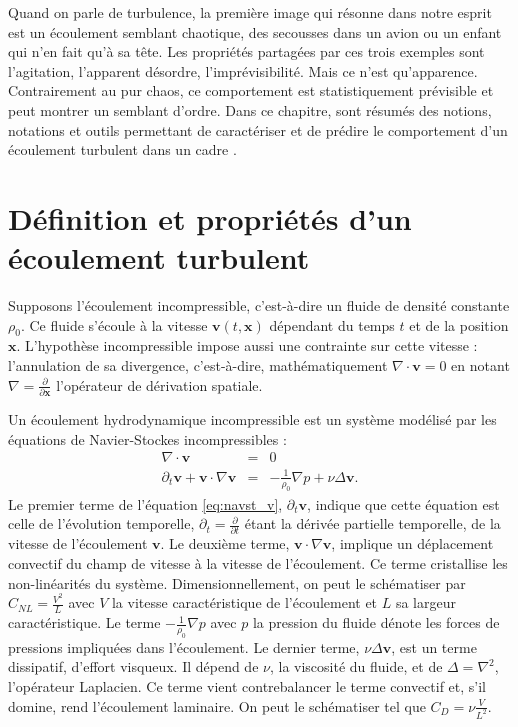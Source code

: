 Quand on parle de turbulence, la première image qui résonne dans notre esprit est un écoulement semblant chaotique, des secousses dans un avion ou un enfant qui n'en fait qu'à sa tête. Les propriétés partagées par ces trois exemples sont l'agitation, l'apparent désordre, l'imprévisibilité. Mais ce n'est qu'apparence. Contrairement au pur chaos, ce comportement est statistiquement prévisible et peut montrer un semblant d'ordre. Dans ce chapitre, sont résumés des notions, notations et outils permettant de caractériser et de prédire le comportement d'un écoulement turbulent dans un cadre . 

\section{Définition et propriétés d'un écoulement turbulent}\label{sec-011}

 Supposons l'écoulement incompressible, c'est-à-dire un fluide de densité constante $\rho_0$. Ce fluide s'écoule à la vitesse $\boldsymbol{v}(t,\mathbf{x})$ dépendant du temps $t$ et de la position $\mathbf{x}$. L'hypothèse incompressible impose aussi une contrainte sur cette vitesse : l'annulation de sa divergence, c'est-à-dire, mathématiquement $\nabla \cdot \boldsymbol{v} = 0$ en notant $\nabla = \frac{\partial}{\partial \mathbf{x}}$ l'opérateur de dérivation spatiale.
 
 Un écoulement hydrodynamique incompressible est un système modélisé par les équations de Navier-Stockes incompressibles :
 \begin{eqnarray}
 \label{eq:navst_r} \nabla \cdot \boldsymbol{v} & =& 0 \\
 \label{eq:navst_v} \partial_t \boldsymbol{v} + \boldsymbol{v} \cdot \nabla \boldsymbol{v} &=& - \frac{1}{\rho_0} \nabla p + \nu \Delta \boldsymbol{v}.
 \end{eqnarray}
 Le premier terme de l'équation \eqref{eq:navst_v}, $\partial_t \boldsymbol{v}$, indique que cette équation est celle de l'évolution temporelle, $\partial_t = \frac{\partial}{\partial t}$ étant la dérivée partielle temporelle, de la vitesse de l'écoulement $\boldsymbol{v}$.
 Le deuxième terme, $\boldsymbol{v} \cdot \nabla \boldsymbol{v}$, implique un déplacement convectif du champ de vitesse à la vitesse de l'écoulement. Ce terme cristallise les non-linéarités du système. Dimensionnellement, on peut le schématiser par $C_{NL} = \frac{V^2}{L}$ avec $V$ la vitesse caractéristique de l'écoulement et $L$ sa largeur caractéristique.
 Le terme $- \frac{1}{\rho_0} \nabla p $ avec $p$ la pression du fluide dénote les forces de pressions impliquées dans l'écoulement.
 Le dernier terme, $\nu \Delta \boldsymbol{v}$, est un terme dissipatif, d'effort visqueux. Il dépend de $\nu$, la viscosité du fluide, et de $\Delta = \nabla^2$, l'opérateur Laplacien. Ce terme vient contrebalancer le terme convectif et, s'il domine, rend l'écoulement laminaire. On peut le schématiser tel que $C_{D} = \nu \frac{V}{L^2}$.
 
